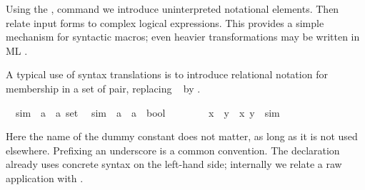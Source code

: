 \begin{isabellebody}
\begin{isamarkuptext}
  Using the , command we
  introduce uninterpreted notational elements.  Then
   relate input forms to complex logical
  expressions.  This provides a simple mechanism for syntactic macros;
  even heavier transformations may be written in ML
  \cite{isabelle-ref}.

  \medskip A typical use of syntax translations is to introduce
  relational notation for membership in a set of pair, replacing \
   by .%
\end{isamarkuptext}%
\isamarkuptrue%
\isamarkupfalse%
\isanewline
\ \ sim\ {\isacharcolon}{\isacharcolon}\ {\isachardoublequoteopen}{\isacharparenleft}{\isacharprime}a\ {\isasymtimes}\ {\isacharprime}a{\isacharparenright}\ set{\isachardoublequoteclose}\isanewline
\isanewline
{}\isamarkupfalse%
\isanewline
\ \ {\isachardoublequoteopen}{\isacharunderscore}sim{\isachardoublequoteclose}\ {\isacharcolon}{\isacharcolon}\ {\isachardoublequoteopen}{\isacharprime}a\ {\isasymRightarrow}\ {\isacharprime}a\ {\isasymRightarrow}\ bool{\isachardoublequoteclose}\ \ \ \ {\isacharparenleft}\ {\isachardoublequoteopen}{\isasymapprox}{\isachardoublequoteclose}\ {}{}{\isacharparenright}\isanewline
\isacommand{translations}\isamarkupfalse%
\isanewline
\ \ {\isachardoublequoteopen}x\ {\isasymapprox}\ y{\isachardoublequoteclose}\ {\isasymrightleftharpoons}\ {\isachardoublequoteopen}{\isacharparenleft}x{\isacharcomma}\ y{\isacharparenright}\ {\isasymin}\ sim{\isachardoublequoteclose}%
\begin{isamarkuptext}%
\noindent Here the name of the dummy constant  does
  not matter, as long as it is not used elsewhere.  Prefixing an
  underscore is a common convention.  The 
  declaration already uses concrete syntax on the left-hand side;
  internally we relate a raw application  with
  .


\end{isamarkuptext}
\end{isabellebody}
